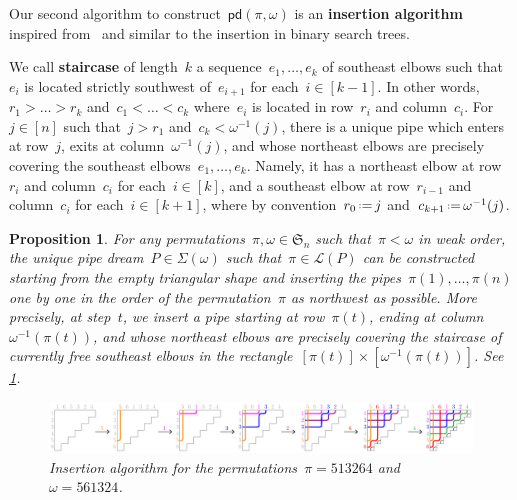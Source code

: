 \documentclass{amsart}
\newtheorem{proposition}[theorem]{Proposition}
\theoremstyle{definition}
\newcommand{\eqdef}{\mbox{\,\raisebox{0.2ex}{\scriptsize\ensuremath{\mathrm:}}\ensuremath{=}\,}} %
\newcommand{\defn}[1]{\textbf{\textsf{\color{PineGreen} #1}}} %
\newcommand{\fS}{\mathfrak{S}} %
\newcommand{\acyclicPipeDreams}{\Sigma} %
\newcommand{\linearExtensions}{\mathcal{L}} %
\newcommand{\insertion}[2]{\mathsf{pd}(#1,#2)} %
\begin{document}
Our second algorithm to construct~$\insertion{\pi}{\omega}$ is an \defn{insertion algorithm} inspired from~\cite{Pilaud-BrickAlgebra} and similar to the insertion in binary search trees.

We call \defn{staircase} of length~$k$ a sequence~$e_1, \dots, e_k$ of southeast elbows such that~$e_i$ is located strictly southwest of~$e_{i+1}$ for each~$i \in [k-1]$. In other words, $r_1 > \dots > r_k$ and~$c_1 < \dots < c_k$ where~$e_i$ is located in row~$r_i$ and column~$c_i$.
For~$j \in [n]$ such that~$j > r_1$ and~$c_k < \omega^{-1}(j)$, there is a unique pipe which enters at row~$j$, exits at column~$\omega^{-1}(j)$, and whose northeast elbows are precisely covering the southeast elbows~$e_1, \dots, e_k$.
Namely, it has a northeast elbow at row~$r_i$ and column~$c_i$ for each~$i \in [k]$, and a southeast elbow at row~$r_{i-1}$ and column~$c_i$ for each~$i \in [k+1]$, where by convention~$r_0 \eqdef j$ and~$c_{k+1} \eqdef \omega^{-1}(j)$.

\begin{proposition}
\label{prop:insertionAlgorithm}
For any permutations~$\pi,\omega \in \fS_n$ such that~$\pi < \omega$ in weak order, the unique pipe dream~$P \in \acyclicPipeDreams(\omega)$ such that~$\pi \in \linearExtensions(P)$ can be constructed starting from the empty triangular shape and inserting the pipes~$\pi(1), \dots, \pi(n)$ one by one in the order of the permutation~$\pi$ as northwest as possible.
More precisely, at step~$t$, we insert a pipe starting at row~$\pi(t)$, ending at column~$\omega^{-1}(\pi(t))$, and whose northeast elbows are precisely covering the staircase of currently free southeast elbows in the rectangle~$[\pi(t)] \times [\omega^{-1}(\pi(t))]$.
See \cref{fig:insertionAlgorithm}.

\begin{figure}
	\centerline{\includegraphics[scale=.9]{insertion}}
	\caption{Insertion algorithm for the permutations~$\pi = 513264$ and~$\omega = 561324$.}
	\label{fig:insertionAlgorithm}
\end{figure}
\end{proposition}
\end{document}
